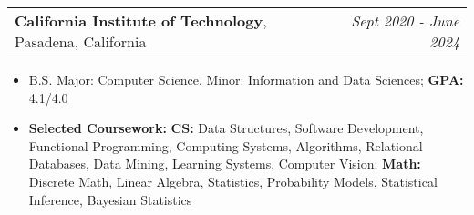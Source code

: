 \documentclass[letterpaper,11pt]{article}
\makeatletter
\newcommand{\resitem}[1]{\item[--] #1}
\newcommand{\edusubheading}[3]{
	\vspace{3pt}
	\begin{tabular*}{7.5in}{l@{\extracolsep{\fill}}r}
		\textbf{#1}, #2 & \textit{#3} \\
	\end{tabular*}
	}
\makeatother
\begin{document}

\edusubheading{California Institute of Technology}
{Pasadena, California}
{Sept 2020 - June 2024}
\begin{itemize}
	\resitem{
		B.S. Major: Computer Science,
		Minor: Information and Data Sciences;
		\textbf{GPA:} 4.1/4.0
	}
	\resitem{
		\textbf{Selected Coursework:}
		\textbf{CS:}
		Data Structures,
		Software Development,
		Functional Programming,
		Computing Systems,
		Algorithms,
		Relational Databases,
		Data Mining,
		Learning Systems,
		Computer Vision;
		\textbf{Math:}
		Discrete Math,
		Linear Algebra,
		Statistics,
		Probability Models,
		Statistical Inference,
		Bayesian Statistics
	}
\end{itemize}

\end{document}
